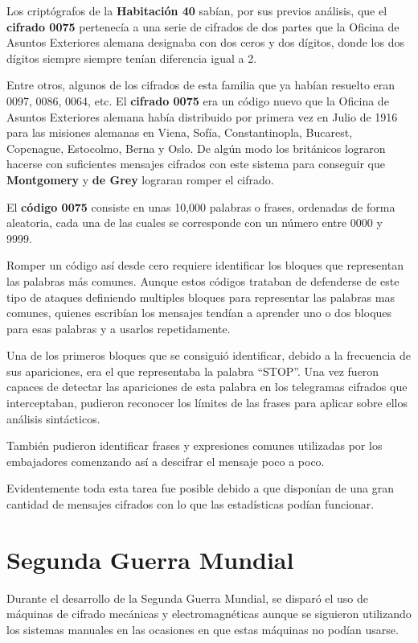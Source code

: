 \documentclass[nochap]{apuntesURJC}
\begin{document}
Los criptógrafos de la \textbf{Habitación 40} sabían, por sus previos análisis, que el \textbf{cifrado 0075} pertenecía a una serie de cifrados de dos partes que la Oficina de Asuntos Exteriores alemana designaba con dos ceros y dos dígitos, donde los dos dígitos siempre siempre tenían diferencia igual a 2.

Entre otros, algunos de los cifrados de esta familia que ya habían resuelto eran 0097, 0086, 0064, etc. El \textbf{cifrado 0075} era un código nuevo que la Oficina de Asuntos Exteriores alemana había distribuido por primera vez en Julio de 1916 para las misiones alemanas en Viena, Sofía, Constantinopla, Bucarest, Copenague, Estocolmo, Berna y Oslo. De algún modo los británicos lograron hacerse con suficientes mensajes cifrados con este sistema para conseguir que \textbf{Montgomery} y \textbf{de Grey} lograran romper el cifrado.

El \textbf{código 0075} consiste en unas 10,000 palabras o frases, ordenadas de forma aleatoria, cada una de las cuales se corresponde con un número entre 0000 y 9999.

Romper un código así desde cero requiere identificar los bloques que representan las palabras más comunes. Aunque estos códigos trataban de defenderse de este tipo de ataques definiendo multiples bloques para representar las palabras mas comunes, quienes escribían los mensajes tendían a aprender uno o dos bloques para esas palabras y a usarlos repetidamente.

Una de los primeros bloques que se consiguió identificar, debido a la frecuencia de sus apariciones, era el que representaba la palabra ``STOP''. Una vez fueron capaces de detectar las apariciones de esta palabra en los telegramas cifrados que interceptaban, pudieron reconocer los límites de las frases para aplicar sobre ellos análisis sintácticos.

También pudieron identificar frases y expresiones comunes utilizadas por los embajadores comenzando así a descifrar el mensaje poco a poco.

Evidentemente toda esta tarea fue posible debido a que disponían de una gran cantidad de mensajes cifrados con lo que las estadísticas podían funcionar.

\section{Segunda Guerra Mundial}
Durante el desarrollo de la Segunda Guerra Mundial, se disparó el uso de máquinas de cifrado mecánicas y electromagnéticas aunque se siguieron utilizando los sistemas manuales en las ocasiones en que estas máquinas no podían usarse.
\end{document}
